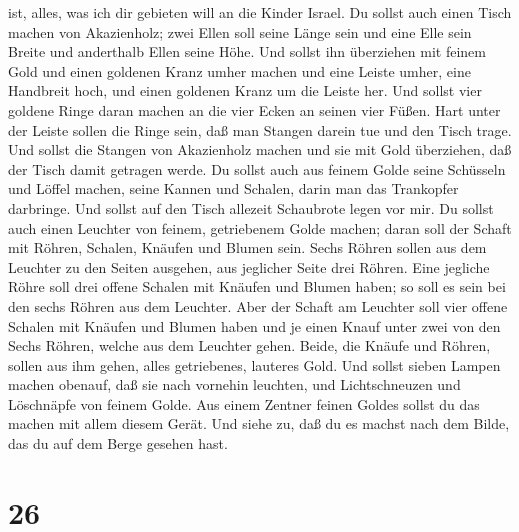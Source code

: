 ist, alles, was ich dir gebieten will an die Kinder Israel.
 Du sollst auch einen Tisch machen von Akazienholz; zwei
Ellen soll seine Länge sein und eine Elle sein Breite und anderthalb
Ellen seine Höhe.  Und sollst ihn überziehen mit feinem
Gold und einen goldenen Kranz umher machen  und eine Leiste
umher, eine Handbreit hoch, und einen goldenen Kranz um die Leiste her.
 Und sollst vier goldene Ringe daran machen an die vier
Ecken an seinen vier Füßen.  Hart unter der Leiste sollen
die Ringe sein, daß man Stangen darein tue und den Tisch trage.
 Und sollst die Stangen von Akazienholz machen und sie mit
Gold überziehen, daß der Tisch damit getragen werde.  Du
sollst auch aus feinem Golde seine Schüsseln und Löffel machen, seine
Kannen und Schalen, darin man das Trankopfer darbringe. 
Und sollst auf den Tisch allezeit Schaubrote legen vor mir.
 Du sollst auch einen Leuchter von feinem, getriebenem
Golde machen; daran soll der Schaft mit Röhren, Schalen, Knäufen und
Blumen sein.  Sechs Röhren sollen aus dem Leuchter zu den
Seiten ausgehen, aus jeglicher Seite drei Röhren.  Eine
jegliche Röhre soll drei offene Schalen mit Knäufen und Blumen haben; so
soll es sein bei den sechs Röhren aus dem Leuchter.  Aber
der Schaft am Leuchter soll vier offene Schalen mit Knäufen und Blumen
haben  und je einen Knauf unter zwei von den Sechs Röhren,
welche aus dem Leuchter gehen.  Beide, die Knäufe und
Röhren, sollen aus ihm gehen, alles getriebenes, lauteres Gold.
 Und sollst sieben Lampen machen obenauf, daß sie nach
vornehin leuchten,  und Lichtschneuzen und Löschnäpfe von
feinem Golde.  Aus einem Zentner feinen Goldes sollst du
das machen mit allem diesem Gerät.  Und siehe zu, daß du es
machst nach dem Bilde, das du auf dem Berge gesehen hast.

\hypertarget{section-25}{%
\section{26}\label{section-25}}

